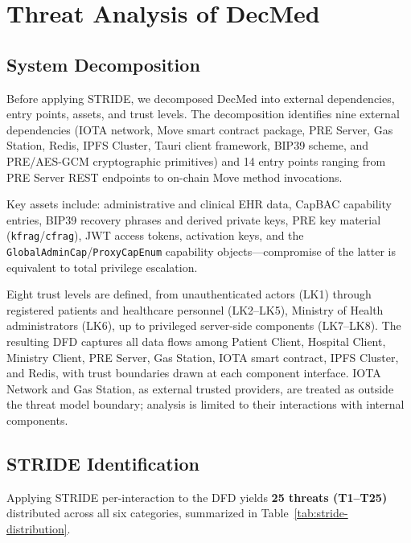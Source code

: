 \section{Threat Analysis of DecMed}
\label{sec:threat-analysis}

\subsection{System Decomposition}

Before applying STRIDE, we decomposed DecMed into external dependencies,
entry points, assets, and trust levels. The decomposition identifies nine
external dependencies (IOTA network, Move smart contract package, PRE
Server, Gas Station, Redis, IPFS Cluster, Tauri client framework, BIP39
scheme, and PRE/AES-GCM cryptographic primitives) and 14 entry points
ranging from PRE Server REST endpoints to on-chain Move method invocations.

Key assets include: administrative and clinical EHR data, CapBAC capability
entries, BIP39 recovery phrases and derived private keys, PRE key material
(\texttt{kfrag}/\texttt{cfrag}), JWT access tokens, activation keys, and the
\texttt{GlobalAdminCap}/\texttt{ProxyCapEnum} capability objects---compromise
of the latter is equivalent to total privilege escalation.

Eight trust levels are defined, from unauthenticated actors (LK1) through
registered patients and healthcare personnel (LK2--LK5), Ministry of Health
administrators (LK6), up to privileged server-side components (LK7--LK8).
The resulting DFD captures all data flows among Patient Client, Hospital
Client, Ministry Client, PRE Server, Gas Station, IOTA smart contract, IPFS
Cluster, and Redis, with trust boundaries drawn at each component interface.
IOTA Network and Gas Station, as external trusted providers, are treated as
outside the threat model boundary; analysis is limited to their interactions
with internal components.

\subsection{STRIDE Identification}

Applying STRIDE per-interaction to the DFD yields \textbf{25 threats
(T1--T25)} distributed across all six categories, summarized in
Table~\ref{tab:stride-distribution}.

